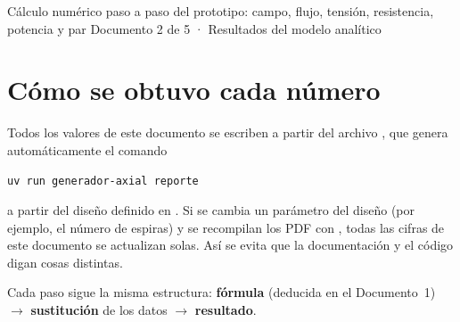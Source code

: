 \documentclass[11pt]{article}
\begin{document}
        {Cálculo numérico paso a paso del prototipo: campo, flujo, tensión, resistencia, potencia y par}
        {Documento 2 de 5 · Resultados del modelo analítico}

\tableofcontents
\newpage

\section{Cómo se obtuvo cada número}
Todos los valores de este documento se escriben a partir del archivo
, que genera automáticamente el comando
\begin{lstlisting}[style=consola]
uv run generador-axial reporte
\end{lstlisting}
a partir del diseño definido en . Si se cambia un parámetro del
diseño (por ejemplo, el número de espiras) y se recompilan los PDF con , todas las
cifras de este documento se actualizan solas. Así se evita que la documentación y el código digan cosas distintas.

Cada paso sigue la misma estructura: \textbf{fórmula} (deducida en el Documento~1) $\rightarrow$
\textbf{sustitución} de los datos $\rightarrow$ \textbf{resultado}.

\end{document}
